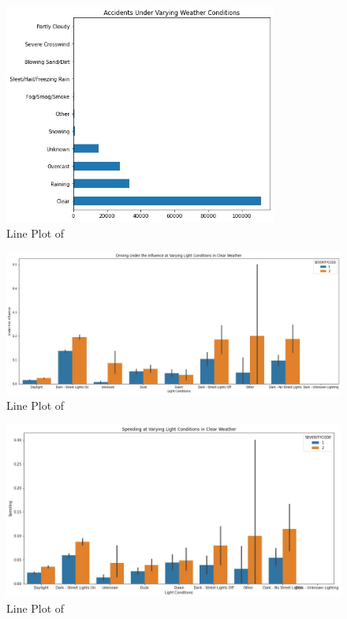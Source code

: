 \documentclass[a4paper,12pt]{article}
\begin{document}
\begin{figure}[]
	\centering
	\includegraphics[width=0.8\textwidth]{weather.jpg}
	\caption{Line Plot of}
	\label{fig1}
\end{figure}


\begin{figure}[]
	\centering
	\includegraphics[width=1.0\textwidth]{li_un_wet.jpg}
	\caption{Line Plot of}
	\label{fig1}
\end{figure}

\begin{figure}[]
	\centering
	\includegraphics[width=1.0\textwidth]{li_sp_wet.jpg}
	\caption{Line Plot of}
	\label{fig1}
\end{figure}
\end{document}
